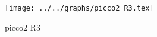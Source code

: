 \begin{figure}[h] \centering\texttt{[image: ../../graphs/picco2\_R3.tex]}\caption{picco2 R3}\label{gr:picco2_R3} \end{figure}
